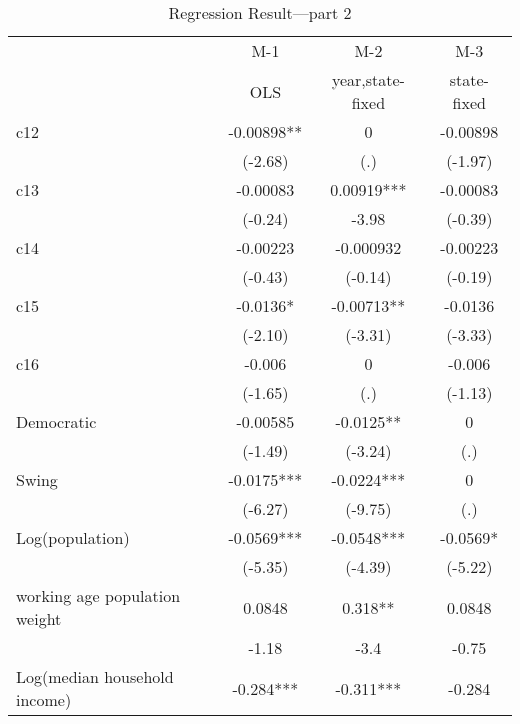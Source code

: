 \clearpage
\begin{table}[htbp]
    \centering
    \caption{Regression Result---part 2}
    \begin{tabular}{p{8.145em}ccc}
        \toprule
        \multicolumn{1}{c}{}          & M-1        & M-2              & M-3         \\
        \multicolumn{1}{c}{}          & OLS        & year,state-fixed & state-fixed \\
        \midrule
        c12                           & -0.00898** & 0                & -0.00898    \\
        \multicolumn{1}{c}{}          & (-2.68)    & (.)              & (-1.97)     \\
        c13                           & -0.00083   & 0.00919***       & -0.00083    \\
        \multicolumn{1}{c}{}          & (-0.24)    & -3.98            & (-0.39)     \\
        c14                           & -0.00223   & -0.000932        & -0.00223    \\
        \multicolumn{1}{c}{}          & (-0.43)    & (-0.14)          & (-0.19)     \\
        c15                           & -0.0136*   & -0.00713**       & -0.0136     \\
        \multicolumn{1}{c}{}          & (-2.10)    & (-3.31)          & (-3.33)     \\
        c16                           & -0.006     & 0                & -0.006      \\
        \multicolumn{1}{c}{}          & (-1.65)    & (.)              & (-1.13)     \\
        Democratic                    & -0.00585   & -0.0125**        & 0           \\
        \multicolumn{1}{c}{}          & (-1.49)    & (-3.24)          & (.)         \\
        Swing                         & -0.0175*** & -0.0224***       & 0           \\
        \multicolumn{1}{c}{}          & (-6.27)    & (-9.75)          & (.)         \\
        Log(population)               & -0.0569*** & -0.0548***       & -0.0569*    \\
        \multicolumn{1}{c}{}          & (-5.35)    & (-4.39)          & (-5.22)     \\
        working age population weight & 0.0848     & 0.318**          & 0.0848      \\
        \multicolumn{1}{c}{}          & -1.18      & -3.4             & -0.75       \\
        Log(median household income)  & -0.284***  & -0.311***        & -0.284      \\
        \bottomrule
    \end{tabular}%
    \label{Table 2.8}%
\end{table}%


